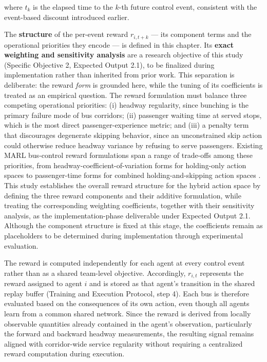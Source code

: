where $t_k$ is the elapsed time to the $k$-th future control event, consistent with the event-based discount introduced earlier.

The \textbf{structure} of the per-event reward $r_{i, t+k}$ --- its component terms and the operational priorities they encode --- is defined in this chapter. Its \textbf{exact weighting and sensitivity analysis} are a research objective of this study (Specific Objective 2, Expected Output 2.1), to be finalized during implementation rather than inherited from prior work. This separation is deliberate: the reward \textit{form} is grounded here, while the tuning of its coefficients is treated as an empirical question. The reward formulation must balance three competing operational priorities: (i) headway regularity, since bunching is the primary failure mode of bus corridors; (ii) passenger waiting time at served stops, which is the most direct passenger-experience metric; and (iii) a penalty term that discourages degenerate skipping behavior, since an unconstrained skip action could otherwise reduce headway variance by refusing to serve passengers. Existing MARL bus-control reward formulations span a range of trade-offs among these priorities, from headway-coefficient-of-variation forms for holding-only action spaces \cite{Wangsun,Wang2023MultiObj} to passenger-time forms for combined holding-and-skipping action spaces \cite{Rodriguez2023Cooperative}. This study establishes the overall reward structure for the hybrid action space by defining the three reward components and their additive formulation, while treating the corresponding weighting coefficients, together with their sensitivity analysis, as the implementation-phase deliverable under Expected Output 2.1. Although the component structure is fixed at this stage, the coefficients remain as placeholders to be determined during implementation through experimental evaluation.

The reward is computed independently for each agent at every control event rather than as a shared team-level objective. Accordingly, $r_{i,t}$ represents the reward assigned to agent $i$ and is stored as that agent's transition in the shared replay buffer (Training and Execution Protocol, step 4). Each bus is therefore evaluated based on the consequences of its own action, even though all agents learn from a common shared network. Since the reward is derived from locally observable quantities already contained in the agent's observation, particularly the forward and backward headway measurements, the resulting signal remains aligned with corridor-wide service regularity without requiring a centralized reward computation during execution.

